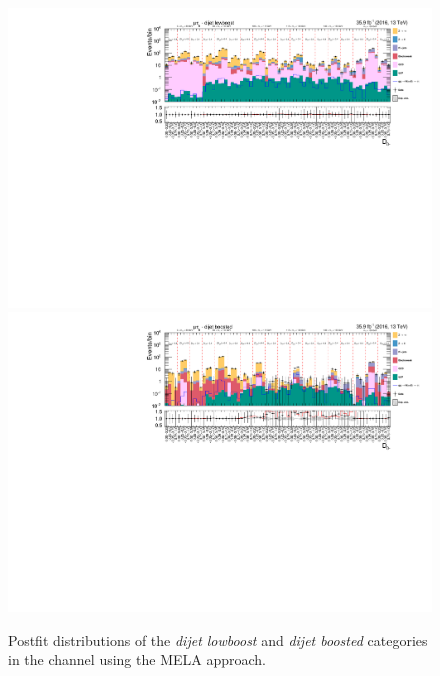 \begin{figure}[h!]
    \centering
        \includegraphics[width=\textwidth]{Figures/statana/Postfit_JEC_mela3D/postfit_fit_s_htt_mt_3_13TeV.pdf}\\
        \includegraphics[width=\textwidth]{Figures/statana/Postfit_JEC_mela3D/postfit_fit_s_htt_mt_4_13TeV.pdf}
    \caption{Postfit distributions of the \textit{dijet lowboost} and \textit{dijet boosted} categories in the \mutau{} channel  using the MELA approach.}
\end{figure}
\clearpage
